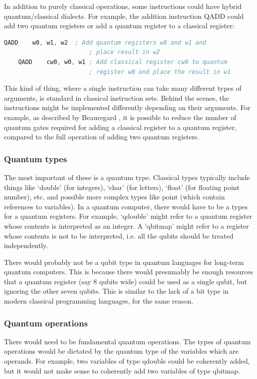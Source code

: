 In addition to purely classical operations, some instructions could have hybrid quantum/classical dialects. For example, the addition instruction QADD could add two quantum registers or add a quantum register to a classical register:
\begin{lstlisting}[language=asm,caption={Different dialects of QADD}]
    QADD    w0, w1, w2  ; Add quantum registers w0 and w1 and 
                        ; place result in w2
    QADD    cw0, w0, w1 ; Add classical register cw0 to quantum                      
                        ; register w0 and place the result in w1

\end{lstlisting}
This kind of thing, where a single instruction can take many different types of arguments, is standard in classical instruction sets. Behind the scenes, the instructions might be implemented differently depending on their arguments. For example, as described by Beauregard \cite{beauregard2003ShorImplementation}, it is possible to reduce the number of quantum gates required for adding a classical register to a quantum register, compared to the full operation of adding two quantum registers.


\subsubsection{Quantum types}
The most important of these is a quantum type. Classical types typically include things like `double' (for integers), `char' (for letters), `float' (for floating point number), etc. and possible more complex types like point (which contain references to variables). In a quantum computer, there would have to be a types for a quantum registers. For example, `qdouble' might refer to a quantum register whose contents is interpreted as an integer. A `qbitmap' might refer to a register whose contents is not to be interpreted, i.e. all the qubits should be treated independently.

There would probably not be a qubit type in quantum languages for long-term quantum computers. This is because there would presumably be enough resources that a quantum register (say 8 qubits wide) could be used as a single qubit, but ignoring the other seven qubits. This is similar to the lack of a bit type in modern classical programming languages, for the same reason.

\subsubsection{Quantum operations}
There would need to be fundamental quantum operations. The types of quantum operations would be dictated by the quantum type of the variables which are operands. For example, two variables of type qdouble could be coherently added, but it would not make sense to coherently add two variables of type qbitmap.

